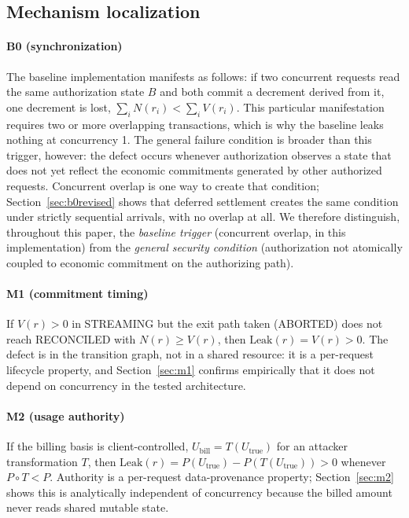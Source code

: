 \documentclass[final,5p,times,twocolumn,number]{elsarticle}
\begin{document}
\subsection{Mechanism localization}
\paragraph{B0 (synchronization)}
The baseline implementation manifests as follows: if two concurrent requests read the
same authorization state $B$ and both commit a decrement derived from it, one decrement
is lost, $\sum_i N(r_i) < \sum_i V(r_i)$. This particular manifestation requires two or
more overlapping transactions, which is why the baseline leaks nothing at concurrency 1.
The general failure condition is broader than this trigger, however: the defect occurs
whenever authorization observes a state that does not yet reflect the economic
commitments generated by other authorized requests. Concurrent overlap is one way to
create that condition; Section~\ref{sec:b0revised} shows that deferred settlement creates
the same condition under strictly sequential arrivals, with no overlap at all. We
therefore distinguish, throughout this paper, the \emph{baseline trigger} (concurrent
overlap, in this implementation) from the \emph{general security condition}
(authorization not atomically coupled to economic commitment on the authorizing path).

\paragraph{M1 (commitment timing)}
If $V(r) > 0$ in STREAMING but the exit path taken (ABORTED) does not reach RECONCILED
with $N(r) \ge V(r)$, then $\mathrm{Leak}(r) = V(r) > 0$. The defect is in the transition
graph, not in a shared resource: it is a per-request lifecycle property, and
Section~\ref{sec:m1} confirms empirically that it does not depend on concurrency in the
tested architecture.

\paragraph{M2 (usage authority)}
If the billing basis is client-controlled, $U_{\text{bill}} = T(U_{\text{true}})$ for an
attacker transformation $T$, then $\mathrm{Leak}(r) = P(U_{\text{true}}) -
P(T(U_{\text{true}})) > 0$ whenever $P \circ T < P$. Authority is a per-request
data-provenance property; Section~\ref{sec:m2} shows this is analytically independent of
concurrency because the billed amount never reads shared mutable state.
\end{document}
